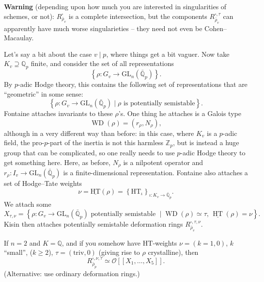 \documentclass[reqno]{amsart} 
\numberwithin{theorem}{section}
\numberwithin{equation}{section}
\numberwithin{exercise}{section}
\begin{document}
\textbf{Warning} (depending upon how much you are interested in singularities of schemes, or not): $R_{\bar{\rho}_v}^{\square}$ is a complete intersection, but the components $R_{\bar{\rho}_v}^{\square, \tau}$ can apparently have much worse singularieties -- they need not even be Cohen--Macaulay.

Let's say a bit about the case $v \mid p$, where things get a bit vaguer.  Now take $K_v \supseteq \mathbb{Q}_p$ finite, and consider the set of all representations
\begin{equation}\label{eq:cq6s0s7n4f}
  \left\{ \rho : G_v \rightarrow \mathrm{GL}_n(\bar{\mathbb{Q}}_p) \right\}.
\end{equation}
By $p$-adic Hodge theory, this contains the following set of representations that are ``geometric'' in some sense:
\begin{equation}\label{eq:cq6s0s8j3o}
  \left\{ \rho : G_v \rightarrow \mathrm{GL}_n(\bar{\mathbb{Q}}_p) \mid \rho \text{ is potentially semistable}\right\}.
\end{equation}
Fontaine attaches invariants to these $\rho$'s.  One thing he attaches is a Galois type
\begin{equation*}
  \operatorname{WD}(\rho) =(r_\rho, N_\rho),
\end{equation*}
although in a very different way than before: in this case, where $K_v$ is a $p$-adic field, the pro-$p$-part of the inertia is not this harmless $\mathbb{Z}_p$, but is instead a huge group that can be complicated, so one really needs to use $p$-adic Hodge theory to get something here.  Here, as before, $N_\rho$ is a nilpotent operator and $r_\rho : I_v \rightarrow \mathrm{GL}_n(\bar{\mathbb{Q}}_p)$ is a finite-dimensional representation.  Fontaine also attaches a set of Hodge--Tate weights
\begin{equation*}
  \nu = \underline{\mathrm{H T}}(\rho) = \left\{ \mathrm{H T}_{\iota} \right\}_{\iota : K_v \rightarrow \bar{\mathbb{Q}}_p}.
\end{equation*}
We attach some
\begin{equation*}
  X_{\tau, \nu} = \left\{ \rho : G_v \rightarrow \mathrm{GL}_n(\bar{\mathbb{Q}}_p) \text{ potentially semistable } \mid
    \operatorname{W D}(\rho) \simeq \tau,
    \,
    \underline{\operatorname{H T}}(\rho) = \nu
  \right\}.
\end{equation*}
Kisin then attaches potentially semistable deformation rings $R_{\bar{\rho}_v}^{\square, \tau, \nu}$.
\begin{remark}\label{remark:cq6thpcqah}
  If $n = 2$ and $K = \mathbb{Q}$, and if you somehow have $\mathrm{H T}$-weights $\nu =(k = 1, 0)$, $k$ ``small'', ($k \geq 2$),
  $\tau = (\mathrm{triv}, 0)$ (giving rise to $\rho$ crystalline), then
  \begin{equation*}
    R_{\bar{\rho}_p}^{\square, \nu, \tau} \simeq \mathcal{O} [[ X_1, \dotsc, X_5]].
  \end{equation*}
  (Alternative: use ordinary deformation rings.)
\end{remark}
\end{document}
